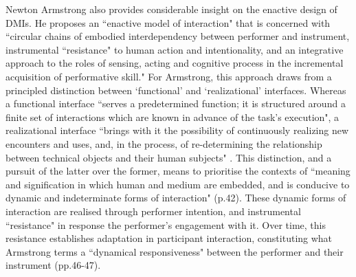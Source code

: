 Newton Armstrong also provides considerable insight on the enactive design of DMIs. He proposes an ``enactive model of interaction" that is concerned with ``circular chains of embodied interdependency between performer and instrument, instrumental ``resistance" to human action and intentionality, and an integrative approach to the roles of sensing, acting and cognitive process in the incremental acquisition of performative skill." For Armstrong, this approach draws from a principled distinction between `functional' and `realizational' interfaces. Whereas a functional interface ``serves a predetermined function; it is structured around a finite set of interactions which are known in advance of the task's execution", a realizational interface ``brings with it the possibility of continuously realizing new encounters and uses, and, in the process, of re-determining the relationship between technical objects and their human subjects" \citep[p. v]{armstrong2006}. This distinction, and a pursuit of the latter over the former, means to prioritise the contexts of ``meaning and signification in which human and medium are embedded, and is conducive to dynamic and indeterminate forms of interaction" (p.42). These dynamic forms of interaction are realised through performer intention, and instrumental ``resistance" in response the performer's engagement with it. Over time, this resistance establishes adaptation in participant interaction, constituting what Armstrong terms a ``dynamical responsiveness" between the performer and their instrument (pp.46-47).  

